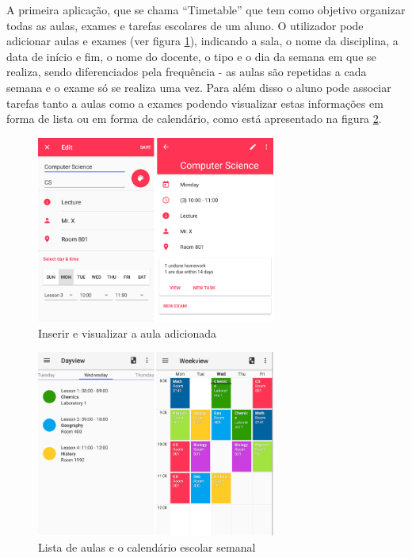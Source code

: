 \documentclass[11pt, twoside]{report}
\begin{document}
	A primeira aplicação, que se chama ``Timetable'' que tem como objetivo organizar todas as aulas, exames e tarefas escolares de um aluno. O utilizador pode adicionar aulas e exames (ver figura \ref{inserirvizualizaraula}), indicando a sala, o nome da disciplina, a data de início e fim, o nome do docente, o tipo e o dia da semana em que se realiza, sendo diferenciados pela frequência - as aulas são repetidas a cada semana e o exame só se realiza uma vez. Para além disso o aluno pode associar tarefas tanto a aulas como a exames podendo visualizar estas informações em forma de lista ou em forma de calendário, como está apresentado na figura \ref{dayweekview}.
		\begin{figure}[H] 
		\centering 
		\includegraphics[width=0.7\textwidth,height=0.7\textheight,keepaspectratio]{image/estadodearte/inserirevizualizar}
		\caption{Inserir e visualizar a aula adicionada}
		\label{inserirvizualizaraula}
	\end{figure}

	\begin{figure}[H] 
		\centering 
		\includegraphics[width=0.7\textwidth,height=0.7\textheight,keepaspectratio]{image/estadodearte/dayweekview}
		\caption{Lista de aulas e o calendário escolar semanal}
		\label{dayweekview}
	\end{figure}
\end{document}

